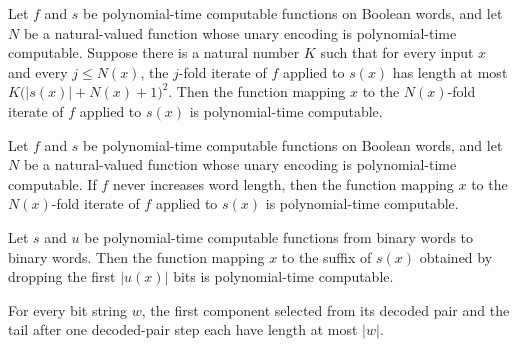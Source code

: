 \begin{lemma}
\label{Complexity.clA5Iter_native}
\leanok
{}
Let $f$ and $s$ be polynomial-time computable functions on Boolean words, and let $N$ be
a natural-valued function whose unary encoding is polynomial-time computable. Suppose
there is a natural number $K$ such that for every input $x$ and every $j\le N(x)$, the
$j$-fold iterate of $f$ applied to $s(x)$ has length at most
$K\bigl(|s(x)|+N(x)+1\bigr)^2$. Then the function mapping $x$ to the $N(x)$-fold iterate
of $f$ applied to $s(x)$ is polynomial-time computable.
\end{lemma}

\begin{lemma}
\label{Complexity.clA5Iter_shrinking}
\leanok
{}
Let $f$ and $s$ be polynomial-time computable functions on Boolean words, and let $N$ be
a natural-valued function whose unary encoding is polynomial-time computable. If $f$
never increases word length, then the function mapping $x$ to the $N(x)$-fold iterate of
$f$ applied to $s(x)$ is polynomial-time computable.
\end{lemma}

\begin{lemma}
\label{Complexity.clA5Drop_native}
\leanok
{}
Let $s$ and $u$ be polynomial-time computable functions from binary words to binary
words. Then the function mapping $x$ to the suffix of $s(x)$ obtained by dropping the
first $|u(x)|$ bits is polynomial-time computable.
\end{lemma}

\begin{lemma}
\label{Complexity.clA5Pair_sizes}
\leanok
{}
For every bit string $w$, the first component selected from its decoded pair and the
tail after one decoded-pair step each have length at most $|w|$.
\end{lemma}

